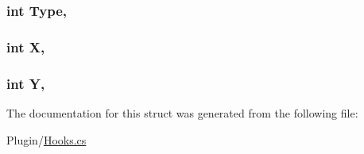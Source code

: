 \subsubsection[{Type}]{\setlength{\rightskip}{0pt plus 5cm}int Type\hspace{0.3cm}{\ttfamily [get]}, {\ttfamily [set]}}\label{structOTA_1_1Plugin_1_1HookArgs_1_1NPCSpawn_ae011432eaca3858364b05a111f4011d3}
\hypertarget{structOTA_1_1Plugin_1_1HookArgs_1_1NPCSpawn_a80c0944640e62d3ed6c5419c1bcc0c88}{}
\subsubsection[{X}]{\setlength{\rightskip}{0pt plus 5cm}int X\hspace{0.3cm}{\ttfamily [get]}, {\ttfamily [set]}}\label{structOTA_1_1Plugin_1_1HookArgs_1_1NPCSpawn_a80c0944640e62d3ed6c5419c1bcc0c88}
\hypertarget{structOTA_1_1Plugin_1_1HookArgs_1_1NPCSpawn_aa482c4cc86a24474e4fb19b5b5978778}{}
\subsubsection[{Y}]{\setlength{\rightskip}{0pt plus 5cm}int Y\hspace{0.3cm}{\ttfamily [get]}, {\ttfamily [set]}}\label{structOTA_1_1Plugin_1_1HookArgs_1_1NPCSpawn_aa482c4cc86a24474e4fb19b5b5978778}


The documentation for this struct was generated from the following file\+:\begin{DoxyCompactItemize}
\item 
Plugin/\hyperlink{Hooks_8cs}{Hooks.\+cs}\end{DoxyCompactItemize}
